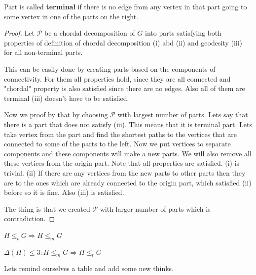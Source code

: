 \begin{defn}
	Part is called \textbf{terminal} if there is no edge from any vertex in that part going to some vertex in one of the parts on the right.
\end{defn}

\begin{proof}
	Let $\mathcal{P}$ be a chordal decomposition of $G$ into parts satisfying both properties of definition of chordal decomposition (i) abd (ii) and geodesity (iii) for all non-terminal parts.
	
	This can be easily done by creating parts based on the components of connectivity. For them all properties hold, since they are all connected and "chordal" property is also satisfied since there are no edges. Also all of them are terminal (iii) doesn't have to be satisfied.
	
	Now we proof by that by choosing $\mathcal{P}$ with largest number of parts. Lets say that there is a part that does not satisfy (iii). This means that it is terminal part. Lets take vertex from the part and find the shortest paths to the vertices that are connected to some of the parts to the left. Now we put vertices to separate components and these components will make a new parts. We will also remove all these vertices from the origin part. Note that all properties are satisfied. (i) is trivial. (ii) If there are any vertices from the new parts to other parts then they are to the ones which are already connected to the origin part, which satisfied (ii) before so it is fine. Also (iii) is satisfied.
	
	The thing is that we created $\mathcal{P}$ with larger number of parts which is contradiction.
\end{proof}

\begin{observ}
	$H \leq_{t} G \Rightarrow H \leq_{m} G$
\end{observ}

\begin{observ}
	$\Delta (H) \leq 3 : H \leq_{m} G \Rightarrow H \leq_{t} G$
\end{observ}

Lets remind ourselves a table and add some new thinks.

